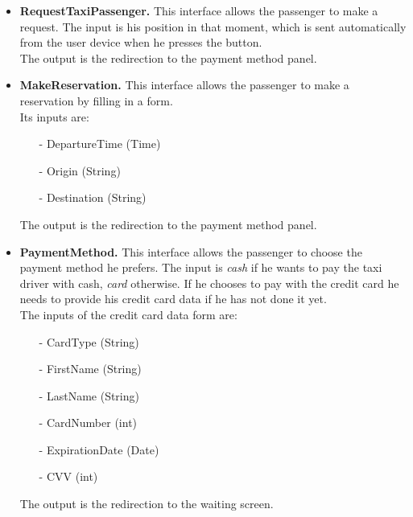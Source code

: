 \begin{itemize}
		\item \textbf{RequestTaxiPassenger.}
		This interface allows the passenger to make a request. The input is his position in that moment, which is sent automatically from the user device when he presses the button. \\The output is the redirection to the payment method panel. 
		\item \textbf{MakeReservation.}
		This interface allows the passenger to make a reservation by filling in a form.\\ Its inputs are:
		\begin{itemize} 
			\item[-] DepartureTime (Time)
			\item[-] Origin (String)
			\item[-] Destination (String)
		\end{itemize}
		The output is the redirection to the payment method panel.
		\newpage
		\item \textbf{PaymentMethod.}
		This interface allows the passenger to choose the payment method he prefers. The input is \textit{cash} if he wants to pay the taxi driver with cash, \textit{card} otherwise. If he chooses to pay with the credit card he needs to provide his credit card data if he has not done it yet. \\ The inputs of the credit card data form are: 
		\begin{itemize} 
			\item[-] CardType (String)
			\item[-] FirstName (String)
			\item[-] LastName (String)
			
			\item[-] CardNumber (int)
			\item[-] ExpirationDate (Date)
			\item[-] CVV (int)
		\end{itemize}
		The output is the redirection to the waiting screen.
	\end{itemize}
	\newpage
